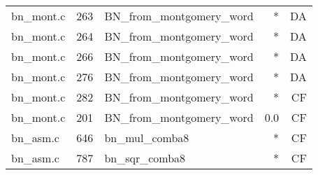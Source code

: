 \begin{table}[h!]
\begin{tabular}{lrlrr}
bn\_mont.c& 263&BN\_from\_montgomery\_word&*&DA\\
bn\_mont.c& 264&BN\_from\_montgomery\_word&*&DA\\
bn\_mont.c& 266&BN\_from\_montgomery\_word&*&DA\\
bn\_mont.c& 276&BN\_from\_montgomery\_word&*&DA\\
bn\_mont.c& 282&BN\_from\_montgomery\_word&*&CF\\
bn\_mont.c& 201&BN\_from\_montgomery\_word&0.0 &CF\\
bn\_asm.c& 646&bn\_mul\_comba8&*&CF\\
bn\_asm.c& 787&bn\_sqr\_comba8&*&CF\\
\hline
\end{tabular}
\renewcommand{\baselinestretch}{1.0}\selectfont
\end{table}
